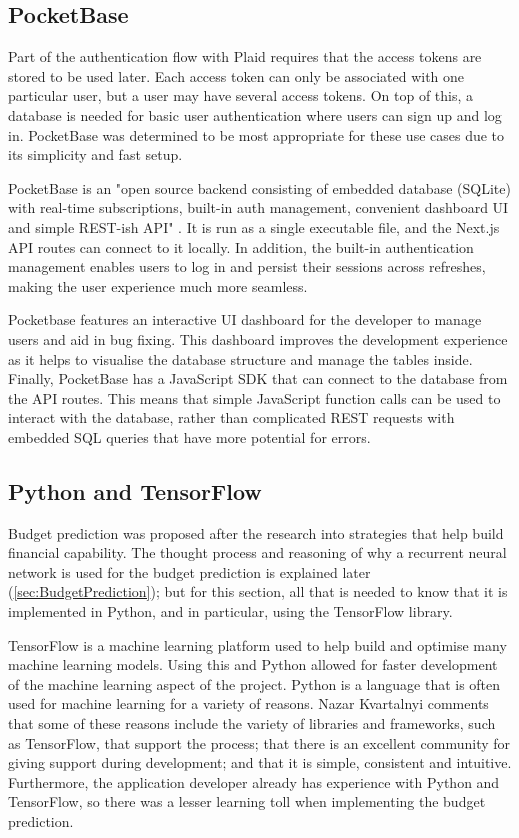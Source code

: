 \subsection{PocketBase}
Part of the authentication flow with Plaid requires that the access tokens are stored to be used later. Each access token can only be associated with one particular user, but a user may have several access tokens. On top of this, a database is needed for basic user authentication where users can sign up and log in. PocketBase was determined to be most appropriate for these use cases due to its simplicity and fast setup.

PocketBase is an "open source backend consisting of embedded database (SQLite) with real-time subscriptions, built-in auth management, convenient dashboard UI and simple REST-ish API" \cite{PocketBaseDocs}. It is run as a single executable file, and the Next.js API routes can connect to it locally. In addition, the built-in authentication management enables users to log in and persist their sessions across refreshes, making the user experience much more seamless.

Pocketbase features an interactive UI dashboard for the developer to manage users and aid in bug fixing. This dashboard improves the development experience as it helps to visualise the database structure and manage the tables inside. Finally, PocketBase has a JavaScript SDK that can connect to the database from the API routes. This means that simple JavaScript function calls can be used to interact with the database, rather than complicated REST requests with embedded SQL queries that have more potential for errors.

\subsection{Python and TensorFlow}
Budget prediction was proposed after the research into strategies that help build financial capability. The thought process and reasoning of why a recurrent neural network is used for the budget prediction is explained later (\ref{sec:BudgetPrediction}); but for this section, all that is needed to know that it is implemented in Python, and in particular, using the TensorFlow library.

TensorFlow is a machine learning platform used to help build and optimise many machine learning models. Using this and Python allowed for faster development of the machine learning aspect of the project. Python is a language that is often used for machine learning for a variety of reasons. Nazar Kvartalnyi \cite{PythonML} comments that some of these reasons include the variety of libraries and frameworks, such as TensorFlow, that support the process; that there is an excellent community for giving support during development; and that it is simple, consistent and intuitive. Furthermore, the application developer already has experience with Python and TensorFlow, so there was a lesser learning toll when implementing the budget prediction.

